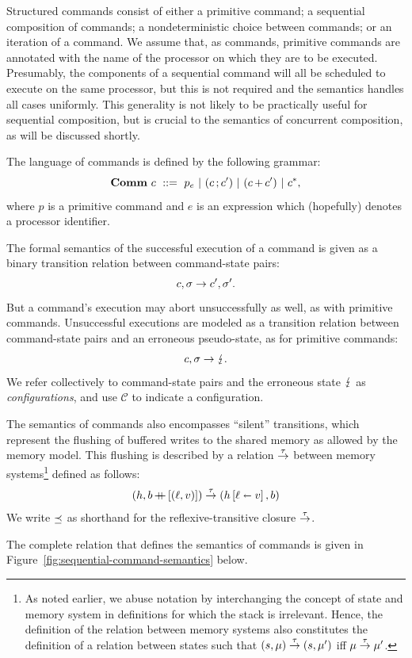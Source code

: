 \documentclass[11pt]{report}
\begin{document}
Structured commands consist of either a primitive command; a sequential composition of commands; a nondeterministic choice between commands; or an iteration of a command. We assume that, as commands, primitive commands are annotated with the name of the processor on which they are to be executed. Presumably, the components of a sequential command will all be scheduled to execute on the same processor, but this is not required and the semantics handles all cases uniformly. This generality is not likely to be practically useful for sequential composition, but is crucial to the semantics of concurrent composition, as will be discussed shortly. 

The language of commands is defined by the following grammar: \[ \mathbf{Comm}~c ~::=~ p_e ~|~ (c \operatorname{;} c') ~|~ (c \operatorname{+} c') ~|~ c^{\operatorname{\ast}},\] where $p$ is a primitive command and $e$ is an expression which (hopefully) denotes a processor identifier.  

The formal semantics of the successful execution of a command is given as a binary transition relation between command-state pairs: \[ c,\sigma \rightarrow c',\sigma'.\] But a command's execution may abort unsuccessfully as well, as with primitive commands. Unsuccessful executions are modeled as a transition relation between command-state pairs and an erroneous pseudo-state, as for primitive commands: \[ c,\sigma \rightarrow \lightning. \] We refer collectively to command-state pairs and the erroneous state $\lightning$ as \emph{configurations}, and use $\mathcal{C}$ to indicate a configuration.

The semantics of commands also encompasses ``silent'' transitions, which represent the flushing of buffered writes to the shared memory as allowed by the memory model. This flushing is described by a relation $\stackrel{\tau}{\rightarrow}$ between memory systems\footnote{As noted earlier, we abuse notation by interchanging the concept of state and memory system in definitions for which the stack is irrelevant. Hence, the definition of the relation between memory systems  also constitutes the definition of a relation between states such that $(s,\mu) \stackrel{\tau}{\rightarrow} (s,\mu')$ iff $\mu \stackrel{\tau}{\rightarrow} \mu'$.} defined as follows: \begin{align*} (h,b \operatorname{+\!\!\!+} \left[(\ell,v)\right]) \stackrel{\tau}{\rightarrow} (h \left[ \ell \shortleftarrow v \right],b) 
\end{align*} We write $\preceq$ as shorthand for the reflexive-transitive closure $\stackrel{\tau}{\rightarrow}$. 

The complete relation that defines the semantics of commands is given in Figure~\ref{fig:sequential-command-semantics} below.
\end{document}
